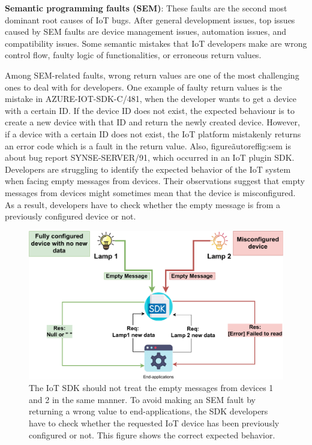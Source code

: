 \textbf{Semantic programming faults (SEM)}: These faults are the second most dominant root causes of IoT bugs. After general development issues, top issues caused by SEM faults are device management issues, automation issues, and compatibility issues. Some semantic mistakes that IoT developers make are wrong control flow, faulty logic of functionalities, or erroneous return values. 

Among SEM-related faults, wrong return values are one of the most challenging ones to deal with for developers. One example of faulty return values is the mistake in AZURE-IOT-SDK-C/481, when the developer wants to get a device with a certain ID. If the device ID does not exist, the expected behaviour is to create a new device with that ID and return the newly created device. However, if a device with a certain ID does not exist, the IoT platform mistakenly returns an error code which is a fault in the return value. Also, figure\~autoref{fig:sem} is about bug report SYNSE-SERVER/91, which occurred in an IoT plugin SDK. Developers are struggling to identify the expected behavior of the IoT system when facing empty messages from devices. Their observations suggest that empty messages from devices might sometimes mean that the device is misconfigured. As a result, developers have to check whether the empty message is from a previously configured device or not.

 \begin{figure}[ht]
  \centering
   \includegraphics[width=\linewidth]{imgs/sem.pdf}
  \caption{The IoT SDK should not treat the empty messages from devices 1 and 2 in the same manner. To avoid making an SEM fault by returning a wrong value to end-applications, the SDK developers have to check whether the requested IoT device has been previously configured or not. This figure shows the correct expected behavior.}
  \label{fig:sem}
\end{figure}

